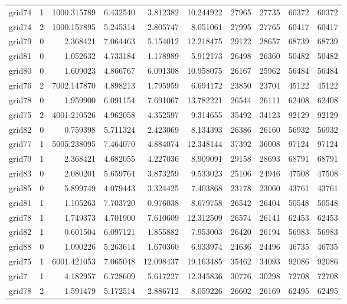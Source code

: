 \begin{longtable}{|l|r|r|r|r|r|r|r|r|r|}
grid74 & 1 & 1000.315789 & 6.432540 & 3.812382 & 10.244922 & 27965 & 27735 & 60372 & 60372 \\
grid74 & 2 & 1000.157895 & 5.245314 & 2.805747 & 8.051061 & 27995 & 27765 & 60417 & 60417 \\
grid79 & 0 & 2.368421 & 7.064463 & 5.154012 & 12.218475 & 29122 & 28657 & 68739 & 68739 \\
grid81 & 0 & 1.052632 & 4.733184 & 1.178989 & 5.912173 & 26498 & 26360 & 50482 & 50482 \\
grid80 & 0 & 1.609023 & 4.866767 & 6.091308 & 10.958075 & 26167 & 25962 & 56484 & 56484 \\
grid76 & 2 & 7002.147870 & 4.898213 & 1.795959 & 6.694172 & 23850 & 23704 & 45122 & 45122 \\
grid78 & 0 & 1.959900 & 6.091154 & 7.691067 & 13.782221 & 26544 & 26111 & 62408 & 62408 \\
grid75 & 2 & 4001.210526 & 4.962058 & 4.352597 & 9.314655 & 35492 & 34123 & 92129 & 92129 \\
grid82 & 0 & 0.759398 & 5.711324 & 2.423069 & 8.134393 & 26386 & 26160 & 56932 & 56932 \\
grid77 & 1 & 5005.238095 & 7.464070 & 4.884074 & 12.348144 & 37392 & 36008 & 97124 & 97124 \\
grid79 & 1 & 2.368421 & 4.682055 & 4.227036 & 8.909091 & 29158 & 28693 & 68791 & 68791 \\
grid83 & 0 & 2.080201 & 5.659764 & 3.873259 & 9.533023 & 25106 & 24946 & 47508 & 47508 \\
grid85 & 0 & 5.899749 & 4.079443 & 3.324425 & 7.403868 & 23178 & 23060 & 43761 & 43761 \\
grid81 & 1 & 1.105263 & 7.703720 & 0.976038 & 8.679758 & 26542 & 26404 & 50548 & 50548 \\
grid78 & 1 & 1.749373 & 4.701900 & 7.610609 & 12.312509 & 26574 & 26141 & 62453 & 62453 \\
grid82 & 1 & 0.601504 & 6.097121 & 1.855882 & 7.953003 & 26420 & 26194 & 56983 & 56983 \\
grid88 & 0 & 1.090226 & 5.263614 & 1.670360 & 6.933974 & 24636 & 24496 & 46735 & 46735 \\
grid75 & 1 & 6001.421053 & 7.065048 & 12.098437 & 19.163485 & 35462 & 34093 & 92086 & 92086 \\
grid7 & 1 & 4.182957 & 6.728609 & 5.617227 & 12.345836 & 30776 & 30298 & 72708 & 72708 \\
grid78 & 2 & 1.591479 & 5.172514 & 2.886712 & 8.059226 & 26602 & 26169 & 62495 & 62495 \\

\end{longtable}
